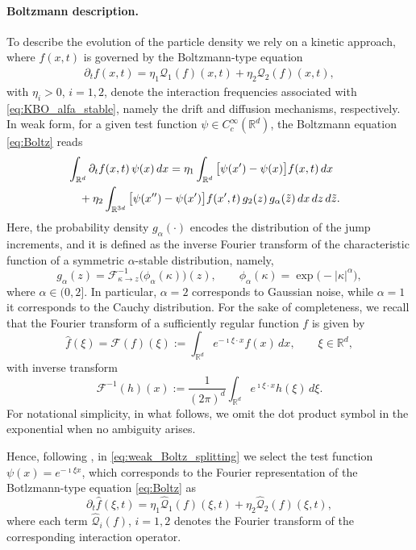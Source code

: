 \documentclass[11pt,handout]{article}%
\numberwithin{equation}{section}
\theoremstyle{definition}
\begin{document}
\paragraph{Boltzmann description.}
To describe the evolution of the particle density we rely on a kinetic approach, where $f(x,t)$ is governed by the Boltzmann-type equation
\begin{align}\label{eq:Boltz}
	\partial_t f(x,t) = \eta_1 \mathcal{Q}_1(f)(x,t) 
	+ \eta_2 \mathcal{Q}_2(f)(x,t),
\end{align}
with $\eta_i>0$, $i=1,2$, denote the interaction frequencies associated with \eqref{eq:KBO_alfa_stable}, namely the drift and diffusion mechanisms, respectively.
In weak form, for a given test function $\psi \in C_c^\infty(\mathbb{R}^d)$, the Boltzmann equation 
\eqref{eq:Boltz} reads
\begin{align}\label{eq:weak_Boltz_splitting}
	&\int_{\mathbb{R}^d} \partial_t f(x,t)\,\psi(x)\,dx
	= \eta_1 \int_{\mathbb{R}^d} \big[\psi(x') - \psi(x)\big] f(x,t)\,dx \cr
	&\quad + \eta_2 \int_{\mathbb{R}^{3d}} \big[\psi(x'') - \psi(x')\big] f(x',t)\, g_2(z)\,g_\alpha(\tilde z)\,dx\,dz\,d\tilde z.
\end{align}
Here, the probability density $g_\alpha(\cdot
)$ encodes the distribution of the jump increments, and it is defined as the inverse Fourier transform of the characteristic function of a symmetric $\alpha$-stable distribution, namely,
\begin{equation*}
	g_\alpha(z) = \mathcal{F}^{-1}_{\kappa \to z}\big(\phi_\alpha(\kappa)\big)(z),
	\qquad 
	\phi_\alpha(\kappa) = \exp\big(-|\kappa|^\alpha\big),
\end{equation*}
where $\alpha \in (0,2]$. In particular, $\alpha=2$ corresponds to Gaussian noise, while $\alpha=1$ it corresponds to the Cauchy distribution. For the sake of completeness, we recall that the Fourier transform of a sufficiently regular function $f$ is given by
\[
\hat{f}(\xi) = \mathcal{F}(f)(\xi) := \int_{\mathbb{R}^d} e^{-\imath \xi \cdot x} f(x)\,dx,
\qquad \xi \in \mathbb{R}^d,
\]
with inverse transform
\[
\mathcal{F}^{-1}(h)(x) := \frac{1}{(2\pi)^d} \int_{\mathbb{R}^d} e^{\imath \xi \cdot x} h(\xi)\,d\xi.
\]
For notational simplicity, in what follows, we omit the dot product symbol in the exponential when no ambiguity arises.

Hence,  following \cite{pareschi2013interacting}, in \eqref{eq:weak_Boltz_splitting} we select the test function $\psi(x) = e^{-\imath \xi x}$, which corresponds to the Fourier representation of the Botlzmann-type equation 
\eqref{eq:Boltz} as
\begin{equation}\label{eq:weak_Boltz_fourier}
	\partial_t \hat{f}(\xi,t) 
	= \eta_1 \hat{\mathcal{Q}}_1(f)(\xi,t) 
	+ \eta_2 \hat{\mathcal{Q}}_2(f)(\xi,t),
\end{equation}
where each term $\hat{\mathcal{Q}}_i(f)$, $i=1,2$ denotes the Fourier transform of the corresponding interaction operator.
\end{document}
